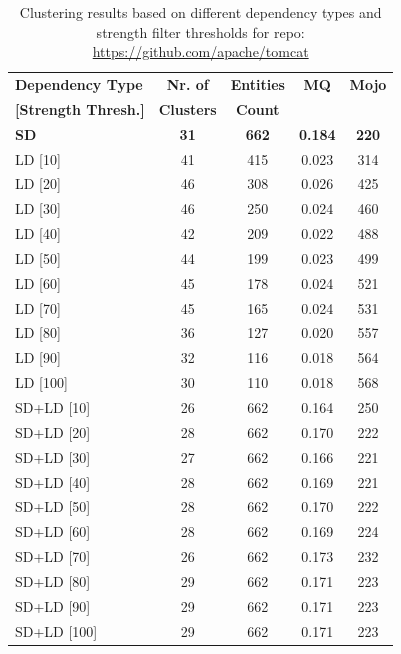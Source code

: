 \documentclass{ieeeaccess}
\begin{document}
\begin{table}
\caption{Clustering results based on different dependency types and strength filter thresholds for repo: \href{https://github.com/apache/tomcat}{https://github.com/apache/tomcat}}
\label{tab:clustering_results_tomcat}
\centering
\setlength{\tabcolsep}{3pt}
\begin{tabular}{|l|c|c|c|c|}
\hline
\textbf{Dependency Type} & \textbf{Nr. of} & \textbf{Entities} & \textbf{MQ} & \textbf{Mojo} \\
\textbf{[Strength Thresh.]} & \textbf{Clusters} & \textbf{Count} &  &  \\
\hline
\textbf{SD} & \textbf{31} & \textbf{662} & \textbf{0.184} & \textbf{220} \\
\hline
LD [10] & 41 & 415 & 0.023 & 314 \\
LD [20] & 46 & 308 & 0.026 & 425 \\
LD [30] & 46 & 250 & 0.024 & 460 \\
LD [40] & 42 & 209 & 0.022 & 488 \\
LD [50] & 44 & 199 & 0.023 & 499 \\
LD [60] & 45 & 178 & 0.024 & 521 \\
LD [70] & 45 & 165 & 0.024 & 531 \\
LD [80] & 36 & 127 & 0.020 & 557 \\
LD [90] & 32 & 116 & 0.018 & 564 \\
LD [100] & 30 & 110 & 0.018 & 568 \\
\hline
SD+LD [10] & 26 & 662 & 0.164 & 250 \\
SD+LD [20] & 28 & 662 & 0.170 & 222 \\
SD+LD [30] & 27 & 662 & 0.166 & 221 \\
SD+LD [40] & 28 & 662 & 0.169 & 221 \\
SD+LD [50] & 28 & 662 & 0.170 & 222 \\
SD+LD [60] & 28 & 662 & 0.169 & 224 \\
SD+LD [70] & 26 & 662 & 0.173 & 232 \\
SD+LD [80] & 29 & 662 & 0.171 & 223 \\
SD+LD [90] & 29 & 662 & 0.171 & 223 \\
SD+LD [100] & 29 & 662 & 0.171 & 223 \\
\hline
\end{tabular}
\end{table}
\end{document}
